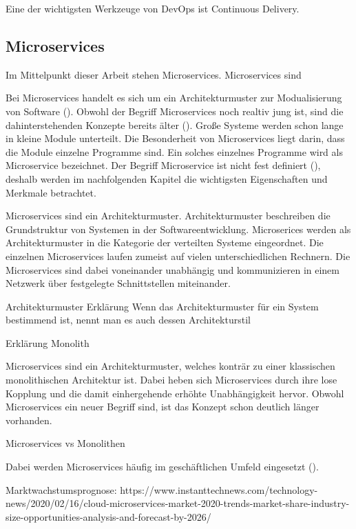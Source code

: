 Eine der wichtigsten Werkzeuge von DevOps ist Continuous Delivery.

\subsection{Microservices}

Im Mittelpunkt dieser Arbeit stehen Microservices. Microservices sind

 Bei Microservices handelt es sich um ein Architekturmuster zur Modualisierung von Software (\cite[S. 15]{newmanMicroservices2015}). Obwohl der Begriff Microservices noch realtiv jung ist, sind die dahinterstehenden Konzepte bereits älter (\cite[S. 15]{newmanMicroservices2015}). Große Systeme werden schon lange in kleine Module unterteilt. Die Besonderheit von Microservices liegt darin, dass die Module einzelne Programme sind. Ein solches einzelnes Programme wird als Microservice bezeichnet. Der Begriff Microservice ist nicht fest definiert (\cite[S. 2]{wolffMicroservices2018}), deshalb werden im nachfolgenden Kapitel die wichtigsten Eigenschaften und Merkmale betrachtet.


Microservices sind ein Architekturmuster. Architekturmuster beschreiben die Grundstruktur von Systemen in der Softwareentwicklung. Microserices werden als Architekturmuster in die Kategorie der verteilten Systeme eingeordnet. Die einzelnen Microservices laufen zumeist auf vielen unterschiedlichen Rechnern. Die Microservices sind dabei voneinander unabhängig und kommunizieren in einem Netzwerk über festgelegte Schnittstellen miteinander.
 
Architekturmuster Erklärung
Wenn das Architekturmuster für ein System bestimmend ist, nennt man es auch dessen Architekturstil

Erklärung Monolith


 Microservices sind ein Architekturmuster, welches konträr zu einer klassischen monolithischen Architektur ist. Dabei heben sich Microservices durch ihre lose Kopplung und die damit einhergehende erhöhte Unabhängigkeit hervor. Obwohl Microservices ein neuer Begriff sind, ist das Konzept schon deutlich länger vorhanden.

Microservices vs Monolithen

Dabei werden Microservices häufig im geschäftlichen Umfeld eingesetzt (\cite[S. 15]{newmanMicroservices2015}). 

Marktwachstumsprognose: https://www.instanttechnews.com/technology-news/2020/02/16/cloud-microservices-market-2020-trends-market-share-industry-size-opportunities-analysis-and-forecast-by-2026/

